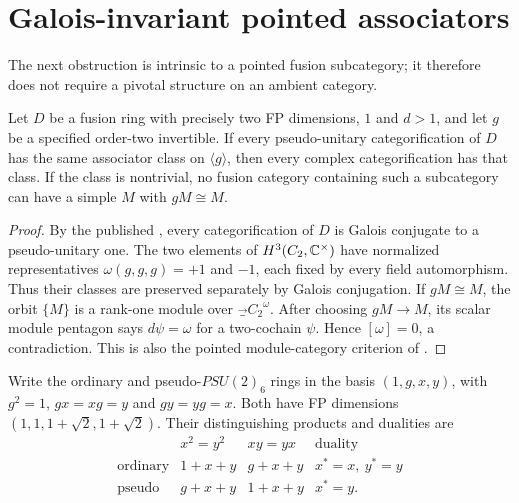 \section{Galois-invariant pointed associators}
\label{sec:pointed-associators}
The next obstruction is intrinsic to a pointed fusion subcategory; it
therefore does not require a pivotal structure on an ambient category.

\begin{lemma}\label{lem:pointed-galois}
Let $D$ be a fusion ring with precisely two FP dimensions, $1$ and $d>1$,
and let $g$ be a specified order-two invertible. If every pseudo-unitary
categorification of $D$ has the same associator class on $\langle g\rangle$,
then every complex categorification has that class.
If the class is nontrivial, no fusion category containing such a
subcategory can have a simple $M$ with $gM\cong M$.
\end{lemma}
\begin{proof}
By the published \cite[Lemma~3.1]{SchNear}, every categorification of $D$
is Galois conjugate to a pseudo-unitary one. The two elements of
$H^3(C_2,\mathbb C^\times)$ have normalized representatives
$\omega(g,g,g)=+1$ and $-1$, each fixed by every field automorphism.
Thus their classes are preserved separately by Galois conjugation.
If $gM\cong M$, the orbit $\{M\}$ is a rank-one module over
$\Vec_{C_2}^{\omega}$. After choosing $gM\to M$, its scalar module
pentagon says $d\psi=\omega$ for a two-cochain $\psi$. Hence
$[\omega]=0$, a contradiction. This is also the pointed module-category
criterion of \cite{EGNO}.
\end{proof}

Write the ordinary and pseudo-$PSU(2)_6$ rings in the basis
$(1,g,x,y)$, with $g^2=1$, $gx=xg=y$ and $gy=yg=x$.
Both have FP dimensions $(1,1,1+\sqrt2,1+\sqrt2)$. Their distinguishing
products and dualities are
\[
\begin{array}{c|ccc}
&x^2=y^2&xy=yx&\text{duality}\\\hline
\text{ordinary}&1+x+y&g+x+y&x^*=x,\ y^*=y\\
\text{pseudo}&g+x+y&1+x+y&x^*=y.
\end{array}
\]

